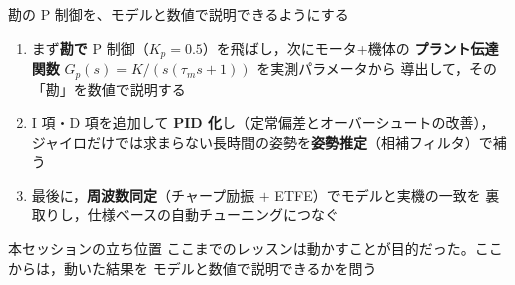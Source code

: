 \begin{frame}{勘の P 制御を、モデルと数値で説明できるようにする}
  \begin{enumerate}\footnotesize\setlength{\itemsep}{0.3em}
    \item まず\textbf{勘で} P 制御（$K_p=0.5$）を飛ばし，次にモータ+機体の
          \textbf{プラント伝達関数} $G_p(s)=K/(s(\tau_m s+1))$ を実測パラメータから
          導出して，その「勘」を数値で説明する
    \item I 項・D 項を追加して \textbf{PID 化}し（定常偏差とオーバーシュートの改善），
          ジャイロだけでは求まらない長時間の姿勢を\textbf{姿勢推定}（相補フィルタ）で補う
    \item 最後に，\textbf{周波数同定}（チャープ励振 $+$ ETFE）でモデルと実機の一致を
          裏取りし，仕様ベースの自動チューニングにつなぐ
  \end{enumerate}

  \vspace{0.2em}

  \begin{alertblock}{本セッションの立ち位置}
    \footnotesize
    ここまでのレッスンは動かすことが目的だった。ここからは，動いた結果を
    モデルと数値で説明できるかを問う
  \end{alertblock}
\end{frame}


